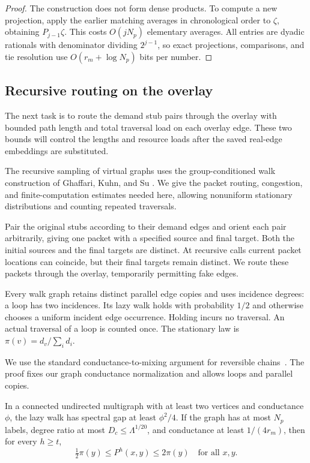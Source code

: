 \begin{proof}
The construction does not form dense products.  To compute a new
projection, apply the earlier matching averages in chronological
order to $\zeta$, obtaining $P_{j-1}\zeta$.  This costs
$O(jN_p)$ elementary averages.  All entries are dyadic rationals
with denominator dividing $2^{j-1}$, so exact projections, comparisons,
and tie resolution use $O(r_m+\log N_p)$ bits per number.
\end{proof}

\subsection{Recursive routing on the overlay}

The next task is to route the demand stub pairs through the overlay
with bounded path length and total traversal load on each overlay
edge.  These two bounds will control the lengths and resource loads
after the saved real-edge embeddings are substituted.

The recursive sampling of virtual graphs uses the group-conditioned
walk construction of Ghaffari, Kuhn, and Su
\cite[Section~3.1.2]{GhaffariKuhnSu2017}.  We give the packet routing,
congestion, and finite-computation estimates needed here, allowing
nonuniform stationary distributions and counting repeated traversals.

Pair the original stubs according to their demand edges and orient
each pair arbitrarily, giving one packet with a specified source and
final target.  Both the initial sources and the final targets are
distinct.  At recursive calls current packet locations can coincide,
but their final targets remain distinct.  We route these packets
through the overlay, temporarily permitting fake edges.

Every walk graph retains distinct parallel edge copies and uses
incidence degrees: a loop has two incidences.  Its lazy walk holds
with probability $1/2$ and otherwise chooses a uniform incident
edge occurrence.  Holding incurs no traversal.  An actual traversal
of a loop is counted once.  The stationary law is
$\pi(v)=d_v/\sum_i d_i$.

We use the standard conductance-to-mixing argument for reversible
chains~\cite[Section~3]{SinclairJerrum1989}. The proof fixes our graph
conductance normalization and allows loops and parallel copies.

\begin{lemma}\label{route:cheeger}
In a connected undirected multigraph with at least two vertices and
conductance $\phi$, the
lazy walk has spectral gap at least $\phi^2/4$.  If the graph has at
most $N_p$ labels, degree ratio at most $D_c\le\Lambda^{1/20}$,
and conductance at least $1/(4r_m)$, then for every $h\ge t$,
\begin{equation}\label{route:pointwise-mixing}
 \tfrac12\pi(y)\le P^h(x,y)\le2\pi(y)
 \quad\text{for all $x,y$}.
\end{equation}
\end{lemma}


